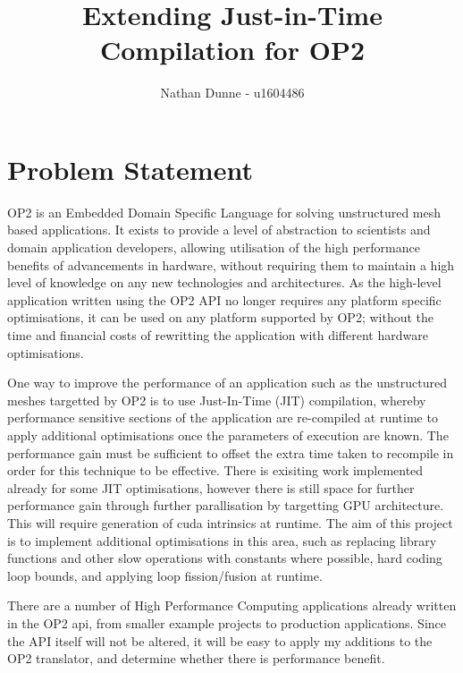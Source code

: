 \documentclass[11pt]{article}
\title{Extending Just-in-Time Compilation for OP2}
\author{Nathan Dunne - u1604486}
\begin{document}
\maketitle
\section*{Problem Statement}
OP2 is an Embedded Domain Specific Language for solving unstructured mesh based applications. It exists to provide a level of abstraction to scientists and domain application developers, allowing utilisation of the high performance benefits of advancements in hardware, without requiring them to maintain a high level of knowledge on any new technologies and architectures. As the high-level application written using the OP2 API no longer requires any platform specific optimisations, it can be used on any platform supported by OP2; without the time and financial costs of rewritting the application with different hardware optimisations.
\newline
\par
One way to improve the performance of an application such as the unstructured meshes targetted by OP2 is to use Just-In-Time (JIT) compilation, whereby performance sensitive sections of the application are re-compiled at runtime to apply additional optimisations once the parameters of execution are known. The performance gain must be sufficient to offset the extra time taken to recompile in order for this technique to be effective. There is exisiting work implemented already for some JIT optimisations, however there is still space for further performance gain through further parallisation by targetting GPU architecture. This will require generation of cuda intrinsics at runtime. The aim of this project is to implement additional optimisations in this area, such as replacing library functions and other slow operations with constants where possible, hard coding loop bounds, and applying loop fission/fusion at runtime.
\newline
\par
There are a number of High Performance Computing applications already written in the OP2 api, from smaller example projects to production applications. Since the API itself will not be altered, it will be easy to apply my additions to the OP2 translator, and determine whether there is performance benefit.
\end{document}
